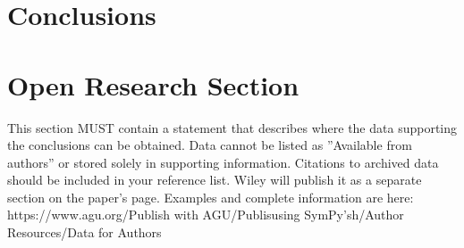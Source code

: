 \section{Conclusions}

%
%
%
%

%








%
%

\section*{Open Research Section}
This section MUST contain a statement that describes where the data supporting the conclusions can be obtained. Data cannot be listed as ''Available from authors'' or stored solely in supporting information. Citations to archived data should be included in your reference list. Wiley will publish it as a separate section on the paper’s page. Examples and complete information are here:
https://www.agu.org/Publish with AGU/Publisusing SymPy'sh/Author Resources/Data for Authors
